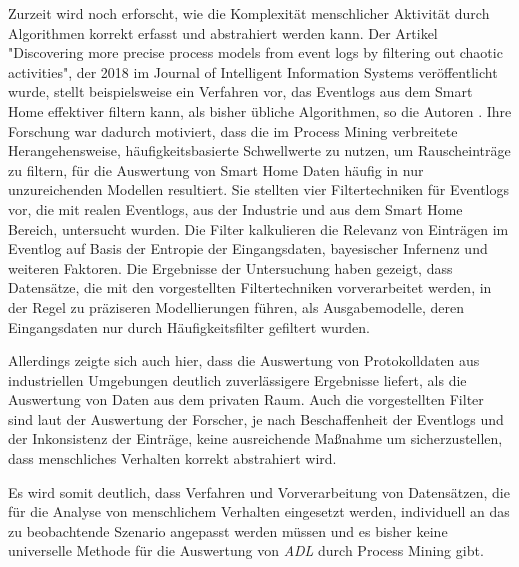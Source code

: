 Zurzeit wird noch erforscht, wie die Komplexität menschlicher Aktivität durch Algorithmen korrekt erfasst und abstrahiert werden kann. Der Artikel "Discovering more precise process models from event logs by filtering out chaotic activities", der 2018 im Journal of Intelligent Information Systems veröffentlicht wurde, stellt beispielsweise ein Verfahren vor, das Eventlogs aus dem Smart Home effektiver filtern kann, als bisher übliche Algorithmen, so die Autoren \cite{Tax2019}. Ihre Forschung war dadurch motiviert, dass die im Process Mining verbreitete Herangehensweise, häufigkeitsbasierte Schwellwerte zu nutzen, um Rauscheinträge zu filtern, für die Auswertung von Smart Home Daten häufig in nur unzureichenden Modellen resultiert. 
Sie stellten vier Filtertechniken für Eventlogs vor, die mit realen Eventlogs, aus der Industrie und aus dem Smart Home Bereich, untersucht wurden. Die Filter kalkulieren die Relevanz von Einträgen im Eventlog auf Basis der Entropie der Eingangsdaten, bayesischer Infernenz und weiteren Faktoren. Die Ergebnisse der Untersuchung haben gezeigt, dass Datensätze, die mit den vorgestellten Filtertechniken vorverarbeitet werden, in der Regel zu präziseren Modellierungen führen, als Ausgabemodelle, deren Eingangsdaten nur durch Häufigkeitsfilter gefiltert wurden. 

Allerdings zeigte sich auch hier, dass die Auswertung von Protokolldaten aus industriellen Umgebungen deutlich zuverlässigere Ergebnisse liefert, als die Auswertung von Daten aus dem privaten Raum. Auch die vorgestellten Filter sind laut der Auswertung der Forscher, je nach Beschaffenheit der Eventlogs und der Inkonsistenz der Einträge, keine ausreichende Maßnahme um sicherzustellen, dass menschliches Verhalten korrekt abstrahiert wird.

Es wird somit deutlich, dass Verfahren und Vorverarbeitung von Datensätzen, die für die Analyse von menschlichem Verhalten eingesetzt werden, individuell an das zu beobachtende Szenario angepasst werden müssen und es bisher keine universelle Methode für die Auswertung von \textit{ADL} durch Process Mining gibt.

